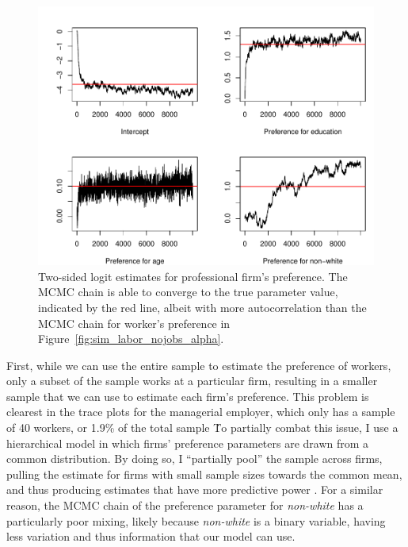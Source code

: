 \begin{figure}[tbp]
  \centering
  \includegraphics[width=\textwidth,keepaspectratio]{../figure/sim_labor_nojobs_beta_emp2}
  \caption[Estimates for professional firm's preference.]{Two-sided
    logit estimates for professional firm's preference. The MCMC chain is able
    to converge to the true parameter value, indicated by the red line, albeit
    with more autocorrelation than the MCMC chain for worker's preference in
    Figure~\ref{fig:sim_labor_nojobs_alpha}.}
  \label{fig:sim_labor_nojobs_beta_emp2}
\end{figure}

First, while we can use the entire sample to estimate the preference of workers,
only a subset of the sample works at a particular firm, resulting in a smaller
sample that we can use to estimate each firm's preference. This problem is
clearest in the trace plots for the managerial employer, which only has a sample
of 40 workers, or 1.9\% of the total sample \. To partially combat this issue, I
use a hierarchical model in which firms' preference parameters are drawn from a
common distribution. By doing so, I ``partially pool'' the sample across firms,
pulling the estimate for firms with small sample sizes towards the common mean,
and thus producing estimates that have more predictive power \citep{Gelman2006}.
For a similar reason, the MCMC chain of the preference parameter for
\textit{non-white} has a particularly poor mixing, likely because
\textit{non-white} is a binary variable, having less variation and thus
information that our model can use.

